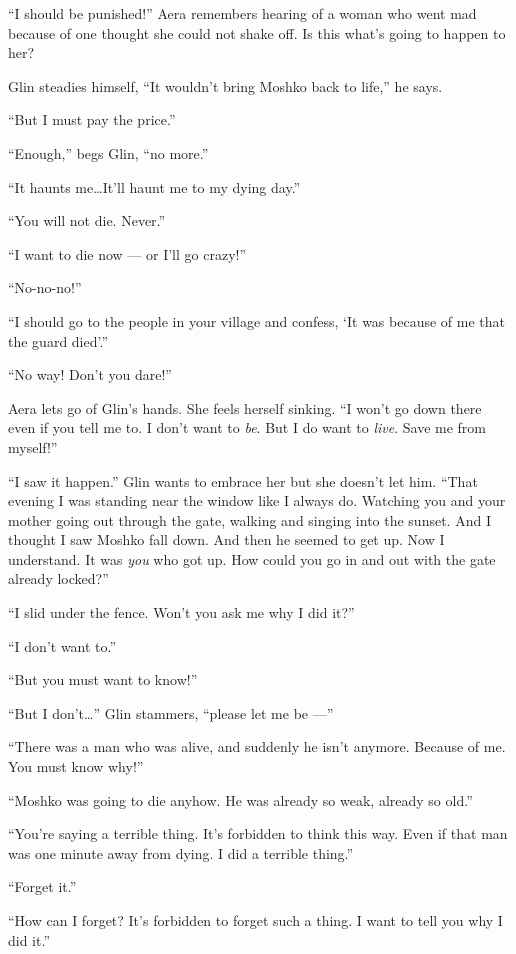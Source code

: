 \documentclass[twoside,11pt]{book}
\begin{document}
``I should be punished!'' Aera remembers hearing of a woman who went mad because of one
thought she could not shake off. Is this what's going to happen to her?

Glin steadies himself, ``It wouldn't bring Moshko back to life,'' he says.

``But I must pay the price.''

``Enough,'' begs Glin, ``no more.''

``It haunts me{\ldots}It'll haunt me to my dying day.''

``You will not die. Never.''

``I want to die now --- or I'll go crazy!''

``No-no-no!''

``I should go to the people in your village and confess, `It was because of me that the guard
died'.''

``No way! Don't you dare!''

Aera lets go of Glin's hands. She feels herself sinking. ``I won't go down there even if you tell me to. I
don't want to \textit{be}. But I do want to \textit{live}. Save me from myself!''

``I saw it happen.'' Glin wants to embrace her but she doesn't let him. ``That
evening I was standing near the window like I always do. Watching you and your mother going out through the gate,
walking and singing into the sunset. And I thought I saw Moshko fall down. And then he seemed to get up. Now I
understand. It was \textit{you} who got up. How could you go in and out with the gate already locked?''

``I slid under the fence. Won't you ask me why I did it?''

``I don't want to.''

``But you must want to know!''

``But I don't{\ldots}'' Glin stammers, ``please let me be ---''

``There was a man who was alive, and suddenly he isn't anymore. Because of me. You must know
why!''

``Moshko was going to die anyhow. He was already so weak, already so old.''

``You're saying a terrible thing. It's forbidden to think this way. Even if that man was one minute away
from dying. I did a terrible thing.''

``Forget it.''

``How can I forget? It's forbidden to forget such a thing. I want to tell you why I did it.''
\end{document}
